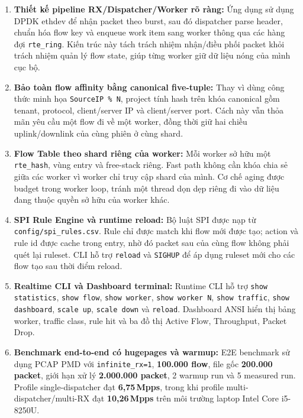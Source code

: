 \documentclass[12pt,a4paper,twoside]{report}
\newcommand{\code}[1]{\texttt{#1}}
\newcommand{\mpps}[1]{#1\,Mpps}
\begin{document}
\begin{enumerate}[itemsep=1pt, topsep=1pt, parsep=0pt, partopsep=0pt]
    \item \textbf{Thiết kế pipeline RX/Dispatcher/Worker rõ ràng:} Ứng dụng
    sử dụng DPDK ethdev để nhận packet theo burst, sau đó dispatcher parse
    header, chuẩn hóa flow key và enqueue work item sang worker thông qua các
    hàng đợi \code{rte\_ring}. Kiến trúc này tách trách nhiệm nhận/điều phối
    packet khỏi trách nhiệm quản lý flow state, giúp từng worker giữ dữ liệu
    nóng của mình cục bộ.

    \item \textbf{Bảo toàn flow affinity bằng canonical five-tuple:} Thay vì
    dùng công thức minh họa \code{SourceIP \% N}, project tính hash trên khóa
    canonical gồm tenant, protocol, client/server IP và client/server port.
    Cách này vẫn thỏa mãn yêu cầu một flow đi về một worker, đồng thời giữ hai
    chiều uplink/downlink của cùng phiên ở cùng shard.

    \item \textbf{Flow Table theo shard riêng của worker:} Mỗi worker sở hữu
    một \code{rte\_hash}, vùng entry và free-stack riêng. Fast path không cần
    khóa chia sẻ giữa các worker vì worker chỉ truy cập shard của mình. Cơ chế
    aging được budget trong worker loop, tránh một thread dọn dẹp riêng đi vào
    dữ liệu đang thuộc quyền sở hữu của worker khác.

    \item \textbf{SPI Rule Engine và runtime reload:} Bộ luật SPI được nạp từ
    \code{config/spi\_rules.csv}. Rule chỉ được match khi flow mới được tạo;
    action và rule id được cache trong entry, nhờ đó packet sau của cùng flow
    không phải quét lại ruleset. CLI hỗ trợ \code{reload} và \code{SIGHUP} để
    áp dụng ruleset mới cho các flow tạo sau thời điểm reload.

    \item \textbf{Realtime CLI và Dashboard terminal:} Runtime CLI hỗ trợ
    \code{show statistics}, \code{show flow}, \code{show worker},
    \code{show worker N}, \code{show traffic}, \code{show dashboard},
    \code{scale up}, \code{scale down} và \code{reload}. Dashboard ANSI hiển thị
    bảng worker, traffic class, rule hit và ba đồ thị Active Flow, Throughput,
    Packet Drop.

    \item \textbf{Benchmark end-to-end có hugepages và warmup:} E2E benchmark
    sử dụng PCAP PMD với \code{infinite\_rx=1}, \textbf{100.000 flow},
    file gốc \textbf{200.000 packet}, giới hạn xử lý \textbf{2.000.000 packet},
    2 warmup run và 5 measured run. Profile single-dispatcher đạt
    \textbf{\mpps{6,75}}, trong khi profile multi-dispatcher/multi-RX đạt
    \textbf{\mpps{10,26}} trên môi trường laptop Intel Core i5-8250U.
\end{enumerate}
\end{document}
